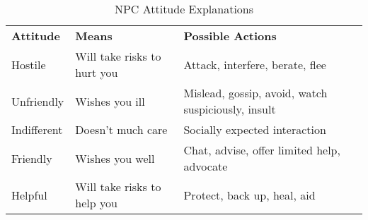 \begin{table}[htb]
\caption{NPC Attitude Explanations}
\centering
\begin{tabular}{l l l}
\textbf{Attitude} & \textbf{Means} & \textbf{Possible Actions}\\
Hostile & Will take risks to hurt you & Attack, interfere, berate, flee\\
Unfriendly & Wishes you ill & Mislead, gossip, avoid, watch suspiciously, insult\\
Indifferent & Doesn't much care & Socially expected interaction\\
Friendly & Wishes you well & Chat, advise, offer limited help, advocate\\
Helpful & Will take risks to help you & Protect, back up, heal, aid\\
\end{tabular}
\end{table}